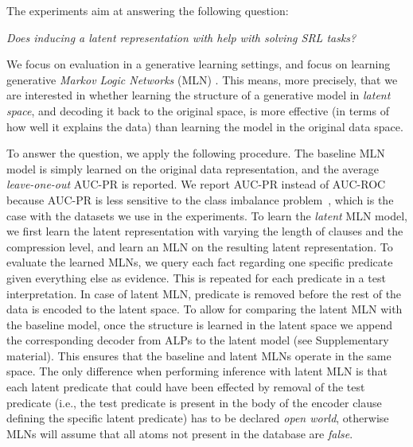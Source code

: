 The experiments aim at answering the following question:


\begin{displayquote}
\textit{Does inducing a latent  representation with  help with solving SRL tasks?}
\end{displayquote}

We focus on evaluation in a generative learning settings, and focus on learning generative \textit{Markov Logic Networks} (MLN) \cite{Richardson2006}.
This means, more precisely, that we are interested in whether learning the structure of a generative model in \textit{latent space}, and decoding it back to the original space, is more effective (in terms of how well it explains the data) than learning the model in the original data space.


To answer the question, we apply the following procedure.
The baseline MLN model is simply learned on the original data representation, and the average \textit{leave-one-out} AUC-PR is reported.
We report AUC-PR instead of AUC-ROC because AUC-PR is less sensitive to the class imbalance problem~\cite{Davis:2006:RPR:1143844.1143874}, which is the case with the datasets we use in the experiments.
To learn the \textit{latent} MLN model, we first learn the latent representation with  varying the length of clauses and the compression level, and learn an MLN on the resulting latent representation.
To evaluate the learned MLNs, we query each fact regarding one specific predicate given everything else as evidence.
This is repeated for each predicate in a test interpretation.
In case of latent MLN, predicate is removed before the rest of the data is encoded to the latent space.
To allow for comparing the latent MLN with the baseline model, once the structure is learned in the latent space we append the corresponding decoder from ALPs to the latent model (see Supplementary material).
This ensures that the baseline and latent MLNs operate in the same space.
The only difference when performing inference with latent MLN is that each latent predicate that could have been effected by removal of the test predicate (i.e., the test predicate is present in the body of the encoder clause defining the specific latent predicate) has to be declared \textit{open world}, otherwise MLNs will assume that all atoms not present in the database are \textit{false}.


